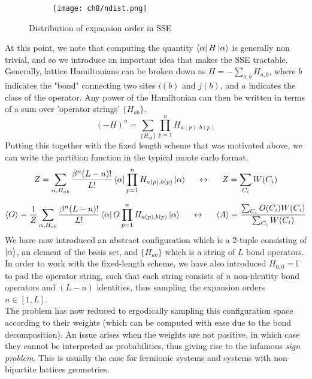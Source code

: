 \begin{figure}[!htb]
    \centering
    \begin{subfigure}[b]{0.75\textwidth}  %
        \centering
        \texttt{[image: ch8/ndist.png]}
    \end{subfigure}
    \caption{Distribution of expansion order in SSE}
    \label{}
\end{figure}
\FloatBarrier \!\!\!\!\!\!\!\!\!\!\!

\vspace{-0.5cm}
At this point, we note that computing the quantity $\bra{\alpha}H\ket{\alpha}$ is generally non trivial, and so we introduce an important idea that makes the SSE tractable. Generally, lattice Hamiltonians can be broken down as $H = -\sum_{a, b} H_{a, b}$, where $b$ indicates the "bond" connecting two sites $i(b)$ and $j(b)$, and $a$ indicates the class of the operator. Any power of the Hamiltonian can then be written in terms of a sum over 'operator strings' $\{H_{ab}\}$.
\begin{equation}
    (-H)^n = \sum_{\{H_{ab}\}} \prod_{p = 1}^n H_{a(p), b(p)}
\end{equation}
Putting this together with the fixed length scheme that was motivated above, we can write the partition function in the typical monte carlo format.
\begin{equation}
    Z = \sum_{\alpha, H_{ab}} \frac{\beta^n (L - n)!}{L!} \bra{\alpha}\prod_{p = 1}^n H_{a(p), b(p)}\ket{\alpha} \hspace{0.5cm} \leftrightarrow \hspace{0.5cm} Z = \sum_{C_i} W(C_i)    
\end{equation}

\begin{equation}
    \langle O \rangle = \frac{1}{Z}\sum_{\alpha, H_{ab}} \frac{\beta^n (L - n)!}{L!} \bra{\alpha}O\prod_{p = 1}^n H_{a(p), b(p)}\ket{\alpha} \hspace{0.5cm} \leftrightarrow \hspace{0.5cm} \langle A \rangle = \frac{\sum_{C_i} O(C_i)W(C_i)}{\sum_{C_i} W(C_i)}
\end{equation}
We have now introduced an abstract configuration which is a 2-tuple consisting of $\ket{\alpha}$, an element of the basis set, and $\{H_{ab}\}$ which is a string of $L$ bond operators. In order to work with the fixed-length scheme, we have also introduced $H_{0,0} = \mathbb{I}$ to pad the operator string, such that each string consists of $n$ non-identity bond operators and $(L-n)$ identities, thus sampling the expansion orders $n \in [1, L]$. 
\vspace{0.5cm}\\
The problem has now reduced to ergodically sampling this configuration space according to their weights (which can be computed with ease due to the bond decomposition). An issue arises when the weights are not positive, in which case they cannot be interpreted as probabilities, thus giving rise to the infamous \textit{sign problem}\cite{pan2022sign}. This is usually the case for fermionic systems and systems with non-bipartite lattices geometries. 

